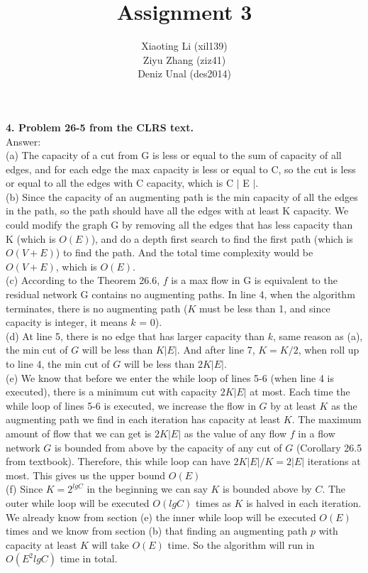 \documentclass{article}
\title{Assignment 3}
\author{Xiaoting Li (xil139)\\
Ziyu Zhang (ziz41) \\
Deniz Unal (des2014)}
\date{}
\begin{document}
\maketitle
\noindent
\textbf{4. Problem 26-5 from the CLRS text.} \\
\noindent
Answer: \\
(a) The capacity of a cut from G is less or equal to the sum of capacity of all edges, and for each edge the max capacity is less or equal to C, so the cut is less or equal to all the edges with C capacity, which is C $|$ E $|$.\\
\newline
(b) Since the capacity of an augmenting path is the min capacity of all the edges in the path, so the path should have all the edges with at least K capacity. We could modify the graph G by removing all the edges that has less capacity than K (which is $O(E)$), and do a depth first search to find the first path (which is $O(V+E)$) to find the path. And the total time complexity would be $O(V+E)$, which is $O(E)$.  \\
\newline
(c) According to the Theorem 26.6, $f$ is a max flow in G is equivalent to the residual network G contains no augmenting paths. In line 4, when the algorithm terminates, there is no augmenting path ($K$ must be less than 1, and since capacity is integer, it means $k$ = 0).\\
\newline
(d) At line 5, there is no edge that has larger capacity than $k$, same reason as (a), the min cut of $G$ will be less than $K |E|$. And after line 7, $K = K/2$, when roll up to line 4, the min cut of $G$ will be less than $2K |E|$.\\
\newline
(e) We know that before we enter the while loop of lines 5-6 (when line 4 is executed), there is a minimum cut with capacity $2K|E|$ at most. Each time the while loop of lines 5-6 is executed, we increase the flow in $G$ by at least $K$ as the augmenting path we find in each iteration has capacity at least $K$. The maximum amount of flow that we can get is $2K|E|$ as the value of any flow $f$ in a flow network $G$ is bounded from above by the capacity of any cut of $G$ (Corollary 26.5 from textbook). Therefore, this while loop can have $2K|E| / K = 2|E|$ iterations at most. This gives us the upper bound $O(E)$
\noindent
\newline 
\\
(f) Since $K = 2^{lgC}$ in the beginning we can say $K$ is bounded above by $C$. The outer while loop will be executed $O(lgC)$ times as $K$ is halved in each iteration. We already know from section (e) the inner while loop will be executed $O(E)$ times and we know from section (b) that finding an augmenting path $p$ with capacity at least $K$ will take $O(E)$ time. So the algorithm will run in $O(E^2lgC)$ time in total.\\
\end{document}
